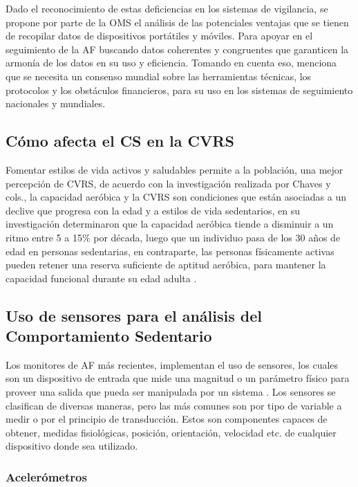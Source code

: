 Dado el reconocimiento de estas deficiencias en los sistemas de vigilancia, se propone por parte de la OMS el análisis de las potenciales ventajas que se tienen de recopilar datos de dispositivos portátiles y móviles. Para apoyar en el seguimiento de la AF buscando datos coherentes y congruentes que garanticen la armonía de los datos en su uso y eficiencia. Tomando en cuenta eso, menciona que se necesita un consenso mundial sobre las herramientas técnicas, los protocolos y los obstáculos financieros, para su uso en los sistemas de seguimiento nacionales y mundiales.

\subsection{Cómo afecta el CS en la CVRS}
\label{subsec:cs_afecta_cvrs}

Fomentar estilos de vida activos y saludables permite a la población, una mejor percepción de CVRS, de acuerdo con la investigación realizada por Chaves y cols., la capacidad aeróbica y la CVRS son condiciones que están asociadas a un declive que progresa con la edad y a estilos de vida sedentarios, en su investigación determinaron que la capacidad aeróbica tiende a disminuir a un ritmo entre 5 a 15\% por década, luego que un individuo pasa de los 30 años de edad en personas sedentarias, en contraparte, las personas físicamente activas pueden retener una reserva suficiente de aptitud aeróbica, para mantener la capacidad funcional durante su edad adulta \citep{Chaves2017Asociacion}.

\subsection{Uso de sensores para el análisis del Comportamiento Sedentario}
\label{subsec:uso_sensores_analisis_cs}

Los monitores de AF más recientes, implementan el uso de sensores, los cuales son un dispositivo de entrada que mide una magnitud o un parámetro físico para proveer una salida que pueda ser manipulada por un sistema \citep{Alvarez2020EnergyExpenditure}. Los sensores se clasifican de diversas maneras, pero las más comunes son por tipo de variable a medir o por el principio de transducción. Estos son componentes capaces de obtener, medidas fisiológicas, posición, orientación, velocidad etc. de cualquier dispositivo donde sea utilizado.

\subsubsection{Acelerómetros}
\label{subsubsec:acelerometros_analisis}

